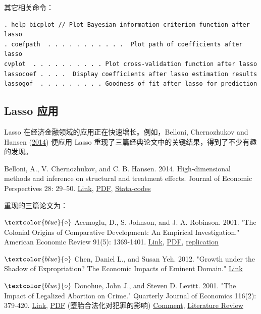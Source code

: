{其它相关命令：

\begin{stverbatim}
\vspace{10pt}
\begin{verbatim}
. help bicplot // Plot Bayesian information criterion function after lasso
. coefpath  . . . . . . . . . . .  Plot path of coefficients after lasso
cvplot  . . . . . . . . . . Plot cross-validation function after lasso
lassocoef . . . .  Display coefficients after lasso estimation results
lassogof  . . . . . . . . . Goodness of fit after lasso for prediction
\end{verbatim}
\end{stverbatim}
\fi      %



\subsection{Lasso 应用}

Lasso 在经济金融领域的应用正在快速增长。例如，Belloni, Chernozhukov and Hansen (\href{https://doi.org/10.1257/jep.28.2.29}{2014}) 便应用 Lasso 重现了三篇经典论文中的关键结果，得到了不少有趣的发现。

Belloni, A., V. Chernozhukov, and C. B. Hansen. 2014. 
High-dimensional methods and inference on structural and treatment effects. 
Journal of Economic Perspectives 28: 29–50. \href{https://doi.org/10.1257/jep.28.2.29}{Link}, \href{http://sci-hub.ren/10.1257/jep.28.2.29}{PDF}, \href{https://academic.oup.com/restud/article/81/2/608/1523757}{Stata-codes}
\vspace{3pt}

重现的三篇论文为：

\vspace{3pt}
$\textcolor{blue}{\circ}$ 
Acemoglu, D., S. Johnson, and J. A. Robinson. 2001. "The Colonial Origins of Comparative Development: An Empirical Investigation." American Economic Review 91(5): 1369-1401. \href{https://www.aeaweb.org/articles?id=10.1257/aer.91.5.1369}{Link},  \href{http://sci-hub.ren/10.1257/aer.91.5.1369}{PDF}, \href{http://economics.mit.edu/faculty/acemoglu/data/ajr2001}{replication}

$\textcolor{blue}{\circ}$ 
Chen, Daniel L., and Susan Yeh. 2012. "Growth under the Shadow of Expropriation? The Economic Impacts of Eminent Domain." \href{https://papers.ssrn.com/sol3/papers.cfm?abstract_id=2977074}{Link}

$\textcolor{blue}{\circ}$ 
Donohue, John J., and Steven D. Levitt. 2001. "The Impact of Legalized Abortion on Crime." Quarterly Journal of Economics 116(2): 379-420. \href{https://doi.org/10.1162/00335530151144050}{Link}, \href{http://sci-hub.ren/10.1162/00335530151144050}{PDF} (堕胎合法化对犯罪的影响)
\href{http://sci-hub.ren/10.1162/qjec.2008.123.1.407}{Comment}, \href{http://sci-hub.ren/10.1093/aler/ahaa008}{Literature Review}

}
